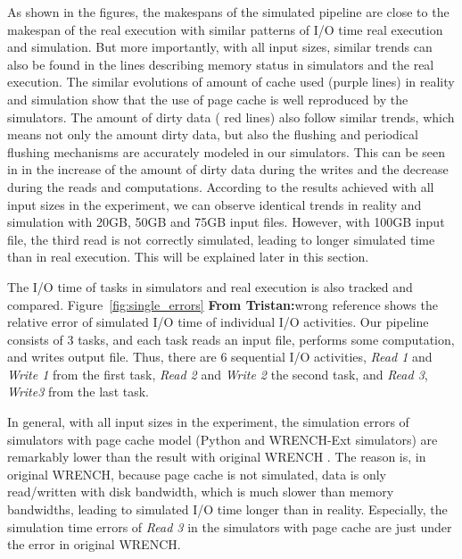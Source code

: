 \documentclass[conference]{IEEEtran}
\newcommand{\tristan}[1]{\color{orange}\textbf{From Tristan:}#1\color{black}}
\begin{document}
			As shown in the figures, the makespans of the simulated pipeline are 
			close to the makespan of the real execution with similar patterns of I/O time 
			real execution and simulation. 
			But more importantly, with all input sizes, similar trends can also be found 
			in the lines describing memory status in simulators and the real execution. 
			The similar evolutions of amount of cache used (purple lines) in reality 
			and simulation show that the use of page cache is well reproduced by the simulators. 
			The amount of dirty data ( red lines) also follow similar trends, 
			which means not only the amount dirty data, but also the flushing and 
			periodical flushing mechanisms are accurately modeled in our simulators. 
			This can be seen in in the increase of the amount of dirty data during the writes 
			and the decrease during the reads and computations. 
			According to the results achieved with all input sizes in the experiment, 
			we can observe identical trends in reality and simulation with 20GB, 
			50GB and 75GB input files. However, with 100GB input file, 
			the third read is not correctly simulated, leading to longer simulated time 
			than in real execution. This will be explained later in this section.
			
			The I/O time of tasks in simulators and real execution is also tracked and compared. 
			Figure~\ref{fig:single_errors} \tristan{wrong reference} shows the relative error of simulated I/O time 
			of individual I/O activities. 
			Our pipeline consists of 3 tasks, and each task reads an input file, 
			performs some computation, and writes output file. 
			Thus, there are 6 sequential I/O activities, \textit{Read 1} and \textit{Write 1} 
			from the first task, \textit{Read 2} and \textit{Write 2} the second task, 
			and \textit{Read 3}, \textit{Write3} from the last task.
			
			In general, with all input sizes in the experiment, the simulation errors 
			of simulators with page cache model (Python and WRENCH-Ext simulators) 
			are remarkably lower than the result with original WRENCH . 
			The reason is, in original WRENCH, because page cache is not simulated, 
			data is only read/written with disk bandwidth, which is much slower 
			than memory bandwidths, leading to simulated I/O time longer than in reality.
			Especially, the simulation time errors of \textit{Read 3} in the simulators 
			with page cache are just under the error in original WRENCH. 
		
\end{document}
